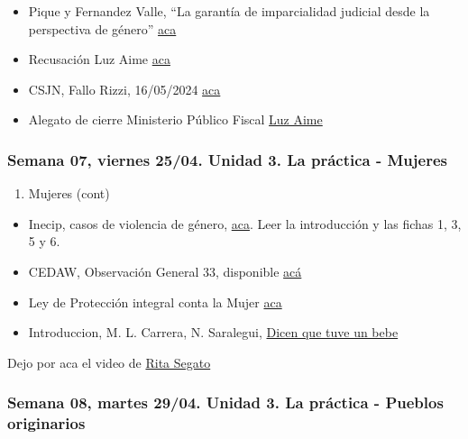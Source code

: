 \documentclass[
]{article}
\providecommand{\tightlist}{%
  \setlength{\itemsep}{0pt}\setlength{\parskip}{0pt}}
\begin{document}
\begin{itemize}
\item
  Pique y Fernandez Valle, ``La garantía de imparcialidad judicial desde
  la perspectiva de género''
  \href{https://drive.google.com/file/d/1atsNG8fNfxcBruDPtPve0N3AmUf6OA3h/view?usp=sharing}{aca}
\item
  Recusación Luz Aime
  \href{https://drive.google.com/file/d/1ZWe1xva3x_Y0ttVg2CZ4eliKBj-8bbBy/preview}{aca}
\item
  CSJN, Fallo Rizzi, 16/05/2024
  \href{https://drive.google.com/file/d/1W6zEuSV0_wshgD8vEc_1HMRiGjlUa-qS/view?usp=sharing}{aca}
\item
  Alegato de cierre Ministerio Público Fiscal
  \href{https://youtu.be/ZKH82JYVLgc}{Luz Aime}
\end{itemize}

\subsubsection{Semana 07, viernes 25/04. Unidad 3. La práctica -
Mujeres}\label{semana-07-viernes-2504.-unidad-3.-la-pruxe1ctica---mujeres}

\begin{enumerate}
\def\labelenumi{\alph{enumi}.}
\setcounter{enumi}{4}
\tightlist
\item
  Mujeres (cont)
\end{enumerate}

\begin{itemize}
\item
  Inecip, casos de violencia de género,
  \href{https://inecip.org/publicaciones/herramientas-jurisprudenciales-para-el-litigio-con-perspectiva-de-genero/}{aca}.
  Leer la introducción y las fichas 1, 3, 5 y 6.
\item
  CEDAW, Observación General 33, disponible
  \href{https://drive.google.com/file/d/1j3suY4Q3JhS5EzbAvs6_K6XSbQsOQ7D7/view?usp=sharing}{acá}
\item
  Ley de Protección integral conta la Mujer
  \href{http://servicios.infoleg.gob.ar/infolegInternet/anexos/150000-154999/152155/texact.htm}{aca}
\item
  Introduccion, M. L. Carrera, N. Saralegui,
  \href{https://drive.google.com/file/d/11CkDJsJytes8lsTh1XaulrLOuNEknJel/view}{Dicen
  que tuve un bebe}
\end{itemize}

Dejo por aca el video de \href{https://youtu.be/prUqWHKnUd4}{Rita
Segato}

\subsubsection{Semana 08, martes 29/04. Unidad 3. La práctica - Pueblos
originarios}\label{semana-08-martes-2904.-unidad-3.-la-pruxe1ctica---pueblos-originarios}
\end{document}

